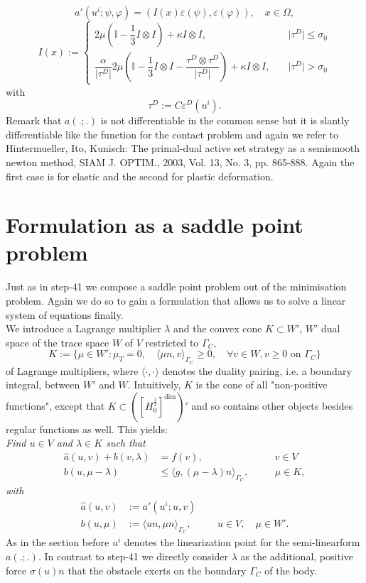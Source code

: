 \documentclass{article}
\begin{document}
$$a'(u^i;\psi,\varphi) =
(I(x)\varepsilon(\psi),\varepsilon(\varphi)),\quad x\in\Omega,$$ $$
I(x) := \begin{cases}
2\mu\left(\mathbb{I}  - \dfrac{1}{3} I\otimes I\right) + \kappa I\otimes I, &
\quad \vert \tau^D \vert \leq \sigma_0\\
\dfrac{\alpha}{\vert\tau^D\vert}2\mu\left(\mathbb{I}  - \dfrac{1}{3} I\otimes I 
- \dfrac{\tau^D\otimes\tau^D}{\vert\tau^D\vert}\right) + \kappa I\otimes I,
&\quad \vert \tau^D \vert > \sigma_0
\end{cases}
$$
with
$$\tau^D :=  C\varepsilon^D(u^i).$$
Remark that $a(.;.)$ is not differentiable in the common sense but it is
slantly differentiable like the function for the contact problem and again we refer to
Hintermueller, Ito, Kunisch: The primal-dual active set strategy as a semismooth newton method, SIAM J. OPTIM., 2003, Vol. 13, No. 3, pp. 865-888.
Again the first case is for elastic and the second for plastic deformation.

\section{Formulation as a saddle point problem}

Just as in step-41 we compose a saddle point problem out of the minimisation
problem. Again we do so to gain a formulation that allows us to solve a linear
system of equations finally.\\
We introduce a Lagrange multiplier $\lambda$ and the convex cone $K\subset W'$,
$W'$ dual space of the trace space $W$ of $V$ restricted to $\Gamma_C$,
$$K:=\{\mu\in W':\mu_T = 0,\quad\langle\mu n,v\rangle_{\Gamma_C}\geq 0,\quad
\forall v\in W, v \ge 0\text{ on }\Gamma_C \}$$
of Lagrange multipliers, where $\langle\cdot,\cdot\rangle$
denotes the duality pairing, i.e. a boundary integral, between $W'$ and $W$.
Intuitively, $K$ is the cone of all "non-positive functions", except that $ K\subset
\left( \left[ H_0^{\frac{1}{2}} \right]^{\textrm{dim}} \right)' $ and so contains other
objects besides regular functions as well. This yields:\\

\noindent
\textit{Find $u\in V$ and $\lambda\in K$ such that}
\begin{align*}
 \hat{a}(u,v) + b(v,\lambda) &= f(v),\quad &&v\in V\\
 b(u,\mu - \lambda) &\leq \langle g,(\mu -
 \lambda)n\rangle_{\Gamma_C},\quad&&\mu\in K,
\end{align*}
\textit{with}
\begin{align*}
 \hat{a}(u,v) &:= a'(u^i;u,v)\\
 b(u,\mu) &:= \langle un,\mu n\rangle_{\Gamma_C},\quad &&u\in V,\quad\mu\in W'.
\end{align*}
As in the section before $u^i$ denotes the linearization point for the
semi-linearform $a(.;.)$. In contrast to step-41 we directly consider $\lambda$
as the additional, positive force $\sigma(u)n$ that the obstacle
exerts on the boundary $\Gamma_C$ of the body.\\
\end{document}
